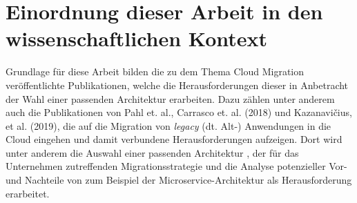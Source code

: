 \section{Einordnung dieser Arbeit in den wissenschaftlichen Kontext}

Grundlage für diese Arbeit bilden die zu dem Thema Cloud Migration veröffentlichte Publikationen, welche die Herausforderungen dieser in Anbetracht der Wahl einer passenden Architektur erarbeiten. Dazu zählen unter anderem auch die Publikationen von Pahl et. al., Carrasco et. al. (2018) und Kazanavičius, et al. (2019), die auf die Migration von \textit{legacy} (dt. Alt-) Anwendungen in die Cloud eingehen und damit verbundene Herausforderungen aufzeigen. Dort wird unter anderem die Auswahl einer passenden Architektur \cite[Vgl.][S. 14]{Pahl}, der für das Unternehmen zutreffenden Migrationsstrategie \cite[Vgl.][S. 4]{Kazanavicius2019} und die Analyse potenzieller Vor- und Nachteile von zum Beispiel der Microservice-Architektur \cite[Vgl.][S. 3]{Carrasco2018} als Herausforderung erarbeitet.